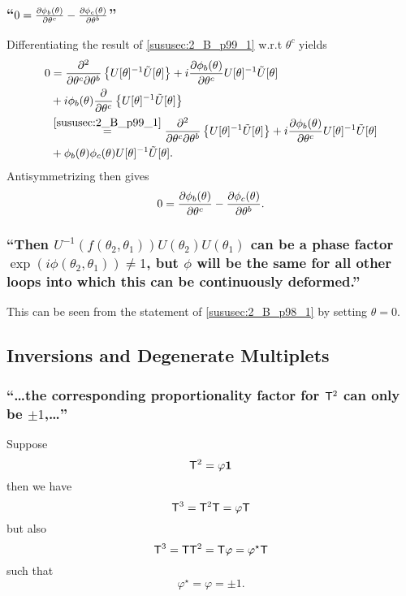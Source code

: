 \subsubsection{\enquote{$0=\partialderivative{\phi_b(\theta)}{\theta^c}-\partialderivative{\phi_c(\theta)}{\theta^b}$} }
Differentiating the result of \ref{sususec:2_B_p99_1} w.r.t $\theta ^c$ yields
\begin{align*} 
	0&=\partialderivative{^2}{\theta^c\partial\theta^b}\left\{U[\theta]^{-1}\tilde{U}[\theta]\right\}+i\partialderivative{\phi_b(\theta)}{\theta^c} U[\theta]^{-1} \tilde{U}[\theta]\\
	&+i\phi_b(\theta)\partialderivative{}{\theta^c}\left\{U[\theta]^{-1}\tilde{U}[\theta]\right\}\\
	&\overset{\ref{sususec:2_B_p99_1}}{=}\partialderivative{^2}{\theta^c\partial\theta^b}\left\{U[\theta]^{-1}\tilde{U}[\theta]\right\}+i\partialderivative{\phi_b(\theta)}{\theta^c} U[\theta]^{-1} \tilde{U}[\theta]\\
	&+\phi_b(\theta)\phi_c(\theta) U[\theta]^{-1} \tilde{U}[\theta].
\end{align*}
Antisymmetrizing then gives 
\[0=\partialderivative{\phi_b(\theta)}{\theta^c}-\partialderivative{\phi_c(\theta)}{\theta^b}.\]

\subsubsection{\enquote{Then $U^{-1}(f(\theta_2,\theta_1))U(\theta_2)U(\theta_1)$ can be a phase factor $\exp(i\phi(\theta_2,\theta_1))\neq 1$, but $\phi$ will be the same for all other loops into which this can be continuously deformed.} }
This can be seen from the statement of \ref{sususec:2_B_p98_1} by setting $\theta =0$.



\subsection{Inversions and Degenerate Multiplets}\label{susec:2_C}

\subsubsection{\enquote{\dots the corresponding proportionality factor for $\mathsf{T}^2$ can only be $\pm1$,\dots} }
Suppose 
\[\mathsf{T}^2=\varphi \mathbf{1}\] 
then we have
\[\mathsf{T}^3=\mathsf{T}^2 \mathsf{T}=\varphi \mathsf{T}\]
but also
\[\mathsf{T}^3=\mathsf{T} \mathsf{T}^2 =\mathsf{T}\varphi=\varphi^\star \mathsf{T}\]
such that
\[\varphi^\star=\varphi=\pm1.\]

